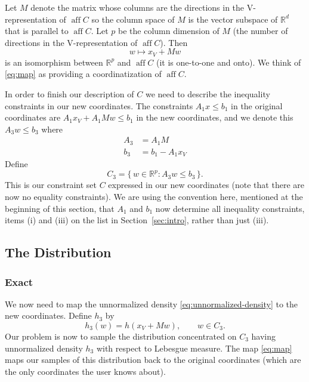 \documentclass[11pt]{article}
\DeclareMathOperator{\aff}{aff}
\newcommand{\real}{\mathbb{R}}
\newcommand{\set}[1]{\{\, #1 \,\}}
\begin{document}
Let $M$ denote the matrix whose columns are the directions in the
V-representation of $\aff C$ so the column space of $M$ is the vector
subspace of $\real^d$ that is parallel to $\aff C$.  Let $p$ be the
column dimension of $M$ (the number of directions in the V-representation
of $\aff C$).  Then
\begin{equation} \label{eq:map}
   w \mapsto x_V + M w
\end{equation}
is an isomorphism between $\real^p$ and $\aff C$ (it is one-to-one and onto).
We think of \eqref{eq:map} as providing a coordinatization of $\aff C$.

In order to finish our description of $C$ we need to describe the inequality
constraints in our new coordinates.  The constraints $A_1 x \le b_1$ in
the original coordinates are $A_1 x_V + A_1 M w \le b_1$
in the new coordinates, and we denote this $A_3 w \le b_3$ where
\begin{align*}
   A_3 & = A_1 M
   \\
   b_3 & = b_1 - A_1 x_V
\end{align*}
Define
$$
   C_3 = \set{ w \in \real^p : A_3 w \le b_3 }.
$$
This is our constraint set $C$ expressed in our new coordinates
(note that there are now no equality constraints).
We are using the convention here, mentioned at the beginning of this section,
that $A_1$ and $b_1$ now determine all inequality constraints, items (i)
and (iii) on the list in Section~\ref{sec:intro}, rather than just (iii).

\subsection{The Distribution}

\subsubsection{Exact}

We now need to map the unnormalized density \eqref{eq:unnormalized-density}
to the new coordinates.  Define $h_3$ by
\begin{equation} \label{eq:h-new}
   h_3(w) = h(x_V + M w), \qquad w \in C_3.
\end{equation}
Our problem is now to sample the distribution concentrated on $C_3$
having unnormalized density $h_3$ with respect to Lebesgue measure.
The map \eqref{eq:map} maps our samples of this distribution back to
the original coordinates (which are the only coordinates the user knows
about).
\end{document}
